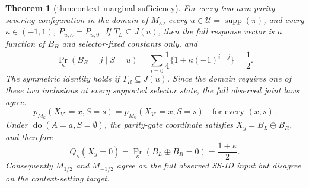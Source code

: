 \documentclass{article}
\newtheorem{theorem}{Theorem}
\begin{document}
\begin{theorem}[thm:context-marginal-sufficiency]\label{thm:context-marginal-sufficiency}
For every two-arm parity-severing configuration in the domain of \(M_\kappa\), every \(u\in\mathcal U=\operatorname{supp}(\pi)\), and every \(\kappa\in(-1,1)\), \(P_{u,\kappa}=P_{u,0}\). If \(T_L\subseteq J(u)\), then the full response vector is a function of \(B_R\) and selector-fixed constants only, and
\[\Pr_\kappa(B_R=j\mid S=u)=\sum_{i=0}^1\frac14\{1+\kappa(-1)^{i+j}\}=\frac12.\]
The symmetric identity holds if \(T_R\subseteq J(u)\). Since the domain requires one of these two inclusions at every supported selector state, the full observed joint laws agree:
\[p_{M_\kappa}(X_{V^\circ}=x,S=s)=p_{M_0}(X_{V^\circ}=x,S=s)\quad\text{for every }(x,s).\]
Under \(\operatorname{do}(A=a,S=\emptyset)\), the parity-gate coordinate satisfies \(X_y=B_L\oplus B_R\), and therefore
\[Q_\kappa(X_y=0)=\Pr_\kappa(B_L\oplus B_R=0)=\frac{1+\kappa}{2}.\]
Consequently \(M_{1/2}\) and \(M_{-1/2}\) agree on the full observed SS-ID input but disagree on the context-setting target.
\end{theorem}
\end{document}
